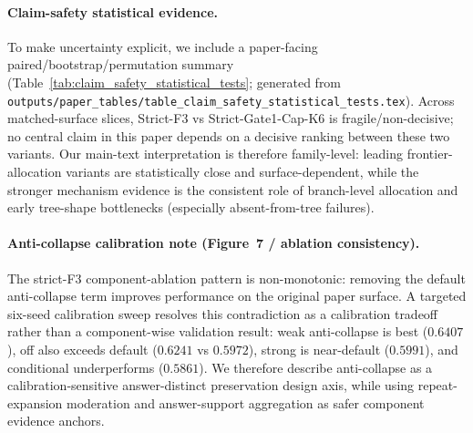 \paragraph{Claim-safety statistical evidence.}
To make uncertainty explicit, we include a paper-facing paired/bootstrap/permutation summary (Table~\ref{tab:claim_safety_statistical_tests}; generated from \texttt{outputs/paper_tables/table\_claim\_safety\_statistical\_tests.tex}). Across matched-surface slices, Strict-F3 vs Strict-Gate1-Cap-K6 is fragile/non-decisive; no central claim in this paper depends on a decisive ranking between these two variants. Our main-text interpretation is therefore family-level: leading frontier-allocation variants are statistically close and surface-dependent, while the stronger mechanism evidence is the consistent role of branch-level allocation and early tree-shape bottlenecks (especially absent-from-tree failures).

\paragraph{Anti-collapse calibration note (Figure~7 / ablation consistency).}
The strict-F3 component-ablation pattern is non-monotonic: removing the default anti-collapse term improves performance on the original paper surface. A targeted six-seed calibration sweep resolves this contradiction as a calibration tradeoff rather than a component-wise validation result: weak anti-collapse is best (\(0.6407\)), off also exceeds default (\(0.6241\) vs \(0.5972\)), strong is near-default (\(0.5991\)), and conditional underperforms (\(0.5861\)). We therefore describe anti-collapse as a calibration-sensitive answer-distinct preservation design axis, while using repeat-expansion moderation and answer-support aggregation as safer component evidence anchors.
